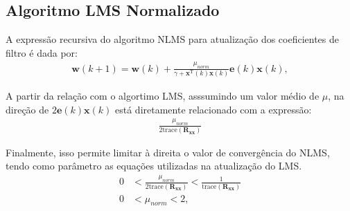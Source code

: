 





\subsection{Algoritmo LMS Normalizado} %
A expressão recursiva do algoritmo NLMS para atualização dos coeficientes de filtro é dada por:
\begin{align*}
    \mathbf{w}(k+1) = \mathbf{w}(k) + \frac{\mu_{norm}}{\gamma + \mathbf{x}^{\text{T}}(k) \mathbf{x}(k)} \mathbf{e}(k) \mathbf{x}(k),
\end{align*}

A partir da relação com o algortimo LMS, asssumindo um valor médio de $\mu$, na direção de $2 \mathbf{e}(k) \mathbf{x}(k)$ está diretamente relacionado com a expressão: 
\begin{align*}
    \frac{\mu_{norm}}{2 \text{trace}(\mathbf{R_{xx}})}
\end{align*}

Finalmente, isso permite limitar à direita o valor de convergência do NLMS, tendo como parâmetro as equações utilizadas na atualização do LMS.
\begin{align*}
    0 &< \frac{\mu_{norm}}{2 \text{trace}(\mathbf{R_{xx}})} < \frac{1}{\text{trace}(\mathbf{R_{xx}})} \\
    0 &< \mu_{norm} < 2, 
\end{align*}
        

